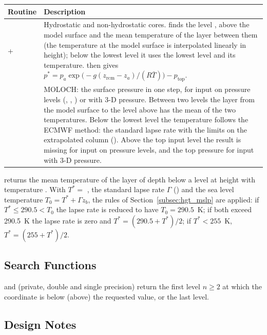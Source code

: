 \begin{longtable}{L{4.5cm} L{9.5cm}}
  \toprule
  \textbf{Routine} & \textbf{Description} \\
  \midrule
  \endhead
  \bottomrule
  \endfoot
   +  &
    Hydrostatic and non-hydrostatic cores.  finds the level
    ,  above the model surface and the mean temperature
    of the layer between them (the temperature at the model surface is
    interpolated linearly in height); below the lowest level it uses the
    lowest level and its temperature.  then gives
    $p^* = p_a\exp\bigl(-g(z_\text{rcm} - z_a)/(R\bar T)\bigr) -
    p_\text{top}$. \\
   &
    MOLOCH: the surface pressure in one step, for input on pressure levels
    (, , ) or with 3-D pressure. Between two
    levels the layer from the model surface to the level above has the
    mean of the two temperatures. Below the lowest level the temperature
    follows the ECMWF method: the standard lapse rate with the limits on
    the extrapolated column (). Above the top input level the
    result is missing for input on pressure levels, and the top pressure
    for input with 3-D pressure. \\
\end{longtable}

\noindent {} returns the mean
temperature of the layer of depth  below a level at height
 with temperature . With $T^* = $ , the standard
lapse rate $\Gamma$ () and the sea level temperature
$T_0 = T^* + \Gamma z_b$, the rules of Section~\ref{subsec:hgt_mslp} are
applied: if $T^* \le 290.5 < T_0$ the lapse rate is reduced to have
$T_0 = 290.5$~K; if both exceed 290.5~K the lapse rate is zero and
$T^* = (290.5 + T^*)/2$; if $T^* < 255$~K, $T^* = (255 + T^*)/2$.

\subsection{Search Functions}

 and  (private, double and
single precision) return the first level $n \ge 2$ at which the coordinate
is below (above) the requested value, or the last level.

\subsection{Design Notes}

